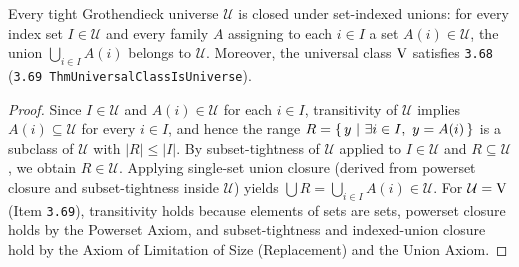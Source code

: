 \begin{proposition}
\label{prop:tight_universe_indexed_union}
Every tight Grothendieck universe $\mathcal{U}$ is closed under set-indexed unions: for every index set $I \in \mathcal{U}$ and every family $A$ assigning to each $i \in I$ a set $A(i) \in \mathcal{U}$, the union $\bigcup_{i \in I} A(i)$ belongs to $\mathcal{U}$. Moreover, the universal class $\mathrm{V}$ satisfies \texttt{3.68} (\texttt{3.69 ThmUniversalClassIsUniverse}).
\end{proposition}
\begin{proof}
Since $I \in \mathcal{U}$ and $A(i) \in \mathcal{U}$ for each $i \in I$, transitivity of $\mathcal{U}$ implies $A(i) \subseteq \mathcal{U}$ for every $i \in I$, and hence the range $R = \left\{\,y\ \middle|\ \exists i \in I,\ y = A(i)\,\right\}$ is a subclass of $\mathcal{U}$ with $|R| \le |I|$. By subset-tightness of $\mathcal{U}$ applied to $I \in \mathcal{U}$ and $R \subseteq \mathcal{U}$, we obtain $R \in \mathcal{U}$. Applying single-set union closure (derived from powerset closure and subset-tightness inside $\mathcal{U}$) yields $\bigcup R = \bigcup_{i \in I} A(i) \in \mathcal{U}$. For $\mathcal{U} = \mathrm{V}$ (Item \texttt{3.69}), transitivity holds because elements of sets are sets, powerset closure holds by the Powerset Axiom, and subset-tightness and indexed-union closure hold by the Axiom of Limitation of Size (Replacement) and the Union Axiom.
\end{proof}


